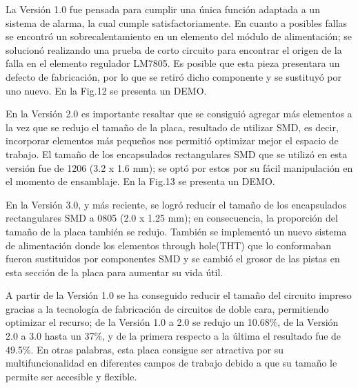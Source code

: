 \documentclass[times, 10pt,twocolumn]{article}
\newcommand{\Img}[5]{
   \begin{figure}[H]
   	   \centering
       \texttt{[image: Img/\#3]}
       \caption{ \centering \textbf{\small #4}}
       \label{#5}
   
       \end{figure}
   }
\begin{document}
La Versión 1.0 fue pensada para cumplir una única función adaptada a un sistema de alarma, la cual cumple satisfactoriamente. En cuanto a posibles fallas se encontró un sobrecalentamiento en un elemento del módulo de alimentación; se solucionó realizando una prueba de corto circuito para encontrar el origen de la falla en el elemento regulador LM7805. Es posible que esta pieza presentara un defecto de fabricación, por lo que se retiró dicho componente y se sustituyó por uno nuevo. En la Fig.12 se presenta un DEMO.

En la Versión 2.0 es importante resaltar que se consiguió agregar más elementos a la vez que se redujo el tamaño de la placa, resultado de utilizar SMD, es decir, incorporar elementos más pequeños nos permitió optimizar mejor el espacio de trabajo. El tamaño de los encapsulados rectangulares SMD que se utilizó en esta versión fue de 1206 (3.2 x 1.6
mm); se optó por estos por su fácil manipulación en el momento de ensamblaje. En la Fig.13 se presenta un DEMO.

En la Versión 3.0, y más reciente, se logró reducir el tamaño de los encapsulados rectangulares SMD a 0805 (2.0 x 1.25 mm); en consecuencia, la proporción del tamaño de la placa también se redujo. También se implementó un nuevo sistema de alimentación donde los elementos through hole(THT) que lo conformaban fueron sustituidos por componentes SMD y se cambió el grosor de las pistas en esta sección de la placa para aumentar su vida útil.

A partir de la Versión 1.0 se ha conseguido reducir el tamaño del circuito impreso gracias a la tecnología de fabricación de circuitos de doble cara, permitiendo optimizar el recurso; de la Versión 1.0 a 2.0 se redujo un 10.68\%, de la Versión 2.0 a 3.0 hasta un 37\%, y de la primera respecto a la última el resultado fue de 49.5\%. En otras palabras, esta placa consigue ser atractiva por su multifuncionalidad en diferentes campos de trabajo debido a que su tamaño le permite ser accesible y flexible.
\end{document}
